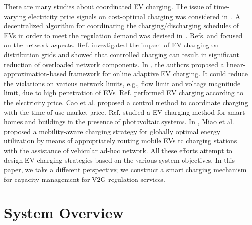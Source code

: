 \documentclass[journal]{IEEEtran}
\begin{document}
There are many studies about coordinated EV charging.
The issue of time-varying electricity price signals on cost-optimal charging was considered in~\cite{time-varying_price}. 
A decentralized algorithm for coordinating the charging/discharging schedules of EVs in order to meet the regulation demand was devised in~\cite{online_scheduling}. 
Refs. \cite{charging_net} and \cite{charging_flow} focused on the network aspects.
Ref. \cite{charging_net} investigated the impact of EV charging on distribution grids and showed that controlled charging can result in significant reduction of overloaded network components. 
In \cite{charging_flow}, the authors proposed a linear-approximation-based framework for online adaptive EV charging. It could reduce the violations on various network limits, e.g., flow limit and voltage magnitude limit, due to high penetration of EVs.
Ref. \cite{charging_price} performed EV charging according to the electricity price. Cao et al. \cite{charging_price} proposed a control method to coordinate charging with the time-of-use market price.
Ref. \cite{charging_building} studied a EV charging method for smart homes and buildings in the presence of photovoltaic systems.
In \cite{charging_mobility}, Miao et al. proposed a mobility-aware charging strategy for globally optimal energy utilization by means of appropriately routing mobile EVs to charging stations with the assistance of vehicular ad-hoc network.
All these efforts attempt to design EV charging strategies based on the various system objectives. In this paper, we take a different perspective; we construct a smart charging mechanism for capacity management for V2G regulation services.



\section{System Overview} \label{sec:overview}
\end{document}
